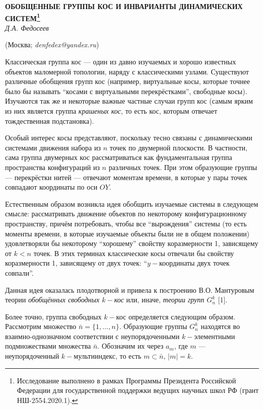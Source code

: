 
\begin{center}
    {\bf ОБОБЩЕННЫЕ ГРУППЫ КОС И ИНВАРИАНТЫ ДИНАМИЧЕСКИХ СИСТЕМ\footnote{Исследование выполнено в рамках Программы Президента Российской Федерации для государственной поддержки ведущих научных школ РФ (грант НШ-2554.2020.1).}}\\

    {\it Д.А. Федосеев}

    (Москва; {\it denfedex@yandex.ru})
\end{center}


Классическая группа кос --- один из давно изучаемых и хорошо известных объектов маломерной топологии, наряду с классическими узлами. Существуют различные обобщения групп кос (например, виртуальные косы, которые точнее было бы называть ``косами с виртуальными перекрёстками'', свободные косы). Изучаются так же и некоторые важные частные случаи групп кос (самым ярким из них является группа {\em крашеных кос}, то есть кос, которым отвечает тождественная подстановка).

Особый интерес косы представляют, поскольку тесно связаны с динамическими системами движения набора из $n$ точек по двумерной плоскости. В частности, сама группа двумерных кос рассматриваться как фундаментальная группа пространства конфигураций из $n$ различных точек. При этом образующие группы --- перекрёстки нитей --- отвечают моментам времени, в которые у пары точек совпадают координаты по оси $OY$.

Естественным образом возникла идея обобщить изучаемые системы в следующем смысле: рассматривать движение объектов по некоторому конфигурационному пространству, причём потребовать, чтобы все ``вырождения'' системы (то есть моменты времени, в которые изучаемые объекты были не в общем положении) удовлетворяли бы некоторому ``хорошему'' свойству коразмерности 1, зависящему от $k<n$ точек. В этих терминах классические косы отвечали бы свойству коразмерности 1, зависящему от двух точек: ``$y-$координаты двух точек совпали''.

Данная идея оказалась плодотворной и привела к построению В.О. Мантуровым теории {\em обобщённых свободных $k-$кос} или, иначе, {\em теории групп $G_n^k$} [1].

Более точно, группа свободных $k-$кос определяется следующим образом. Рассмотрим множество $\bar{n}=\{1,\dots, n\}$. Образующие группы $G_n^k$ находятся во взаимно-однозначном соответствии с неупорядоченными $k-$элементными подмножествами множества $\bar{n}$. Обозначим их через $a_m$, где $m$ --- неупорядоченный $k-$мультииндекс, то есть $m\subset \bar{n}, \, |m|=k$.

